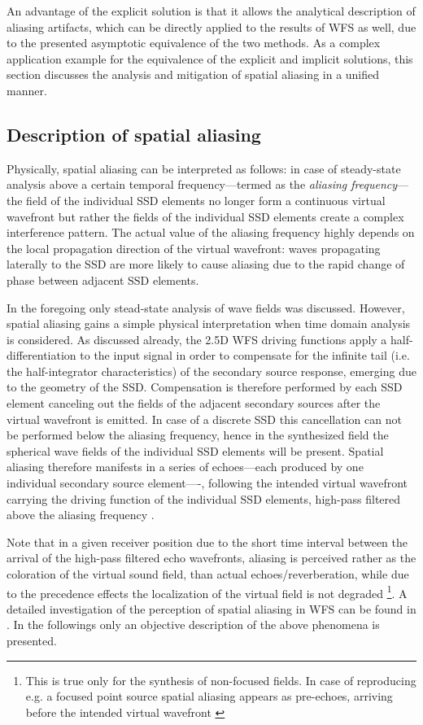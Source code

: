 An advantage of the explicit solution is that it allows the analytical description of aliasing artifacts, which can be directly applied to the results of WFS as well, due to the presented asymptotic equivalence of the two methods.
As a complex application example for the equivalence of the explicit and implicit solutions, this section discusses the analysis and mitigation of spatial aliasing in a unified manner.

\subsection{Description of spatial aliasing}

Physically, spatial aliasing can be interpreted as follows: in case of steady-state analysis above a certain temporal frequency---termed as the \emph{aliasing frequency}--- the field of the individual SSD elements no longer form a continuous virtual wavefront but rather the fields of the individual SSD elements create a complex interference pattern.
The actual value of the aliasing frequency highly depends on the local propagation direction of the virtual wavefront: waves propagating laterally to the SSD are more likely to cause aliasing due to the rapid change of phase between adjacent SSD elements.

In the foregoing only stead-state analysis of wave fields was discussed.
However, spatial aliasing gains a simple physical interpretation when time domain analysis is considered.
As discussed already, the 2.5D WFS driving functions apply a half-differentiation to the input signal in order to compensate for the infinite tail (i.e. the half-integrator characteristics) of the secondary source response, emerging due to the geometry of the SSD.
Compensation is therefore performed by each SSD element canceling out the fields of the adjacent secondary sources after the virtual wavefront is emitted.
In case of a discrete SSD this cancellation can not be performed below the aliasing frequency, hence in the synthesized field the spherical wave fields of the individual SSD elements will be present.
Spatial aliasing therefore manifests in a series of echoes---each produced by one individual secondary source element----, following the intended virtual wavefront carrying the driving function of the individual SSD elements, high-pass filtered above the aliasing frequency \cite{spors2009spatial}. 

Note that in a given receiver position due to the short time interval between the arrival of the high-pass filtered echo wavefronts, aliasing is perceived rather as the coloration of the virtual sound field, than actual echoes/reverberation, while due to the precedence effects the localization of the virtual field is not degraded \footnote{This is true only for the synthesis of non-focused fields.
In case of reproducing e.g. a focused point source spatial aliasing appears as pre-echoes, arriving before the intended virtual wavefront \cite{Spors2009:FocusedSourceAliasing}}.
A detailed investigation of the perception of spatial aliasing in WFS can be found in .
In the followings only an objective description of the above phenomena is presented.

